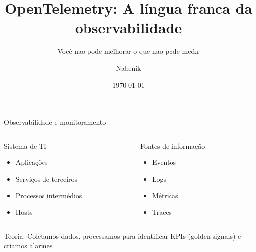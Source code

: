 \documentclass[aspectratio=169]{beamer}
\title{OpenTelemetry: A língua franca da observabilidade}
\subtitle{Você não pode melhorar o que não pode medir}
\author{Nabenik}
\date{\today}
\begin{document}
	
	{
		\begin{frame}
			\maketitle
		\end{frame}
	}
	
	\begin{frame}{Observabilidade e monitoramento}
		
		\begin{columns}
			
			\begin{column}{0.5\textwidth}
				Sistema de TI {\Huge \faServer}
				\begin{itemize}
					\item Aplicações
					\item Serviços de terceiros
					\item Processos intermédios
					\item Hosts
				\end{itemize}
			\end{column}
			
			\begin{column}{0.5\textwidth}
				Fontes de informação {\Huge	 \faBinoculars}
				\begin{itemize}
					\item Eventos
					\item Logs
					\item Métricas
					\item Traces
				\end{itemize}
			\end{column}
		\end{columns}
		Teoria: Coletamos dados, processamos para identificar KPIs (golden signals) e criamos alarmes 
	\end{frame}
\end{document}
